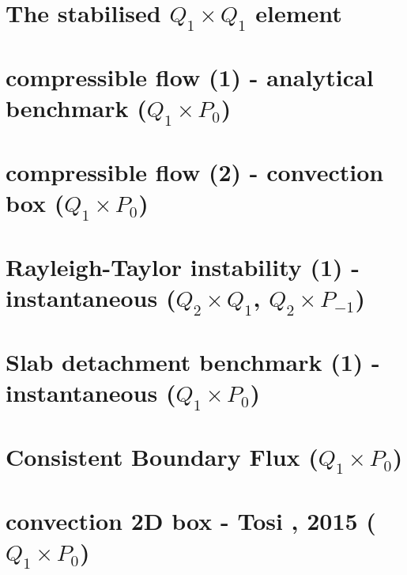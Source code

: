\documentclass[a4paper,11pt]{report}
\begin{document}
\chapter{The stabilised $Q_1 \times Q_1$ element \label{f22}} %

\chapter{compressible flow (1) - analytical benchmark ($Q_1\times P_0$)\label{f23}} %

\chapter{compressible flow (2) - convection box ($Q_1\times P_0$)\label{f24}} %

\chapter{Rayleigh-Taylor instability (1) - instantaneous ($Q_2\times Q_1$, $Q_2\times P_{-1}$)\label{f25}} %

\chapter{Slab detachment benchmark (1) - instantaneous ($Q_1\times P_0$)\label{f26}} %

\chapter{Consistent Boundary Flux ($Q_1\times P_0$)\label{f27}} %

\chapter{convection 2D box - Tosi \etal, 2015 ($Q_1\times P_0$) \label{f28}} %
\end{document}
